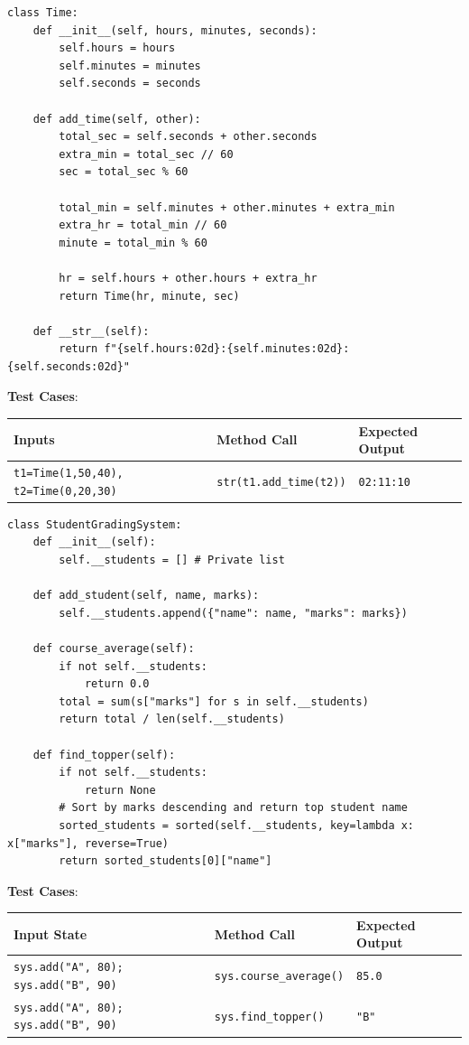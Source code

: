 \begin{solutionbox}
\begin{lstlisting}[language=Python3]
class Time:
    def __init__(self, hours, minutes, seconds):
        self.hours = hours
        self.minutes = minutes
        self.seconds = seconds
        
    def add_time(self, other):
        total_sec = self.seconds + other.seconds
        extra_min = total_sec // 60
        sec = total_sec % 60
        
        total_min = self.minutes + other.minutes + extra_min
        extra_hr = total_min // 60
        minute = total_min % 60
        
        hr = self.hours + other.hours + extra_hr
        return Time(hr, minute, sec)
        
    def __str__(self):
        return f"{self.hours:02d}:{self.minutes:02d}:{self.seconds:02d}"
\end{lstlisting}
\textbf{Test Cases}:
\begin{tabular}{|l|l|l|}
\hline
\textbf{Inputs} & \textbf{Method Call} & \textbf{Expected Output} \\ \hline
\texttt{t1=Time(1,50,40), t2=Time(0,20,30)} & \texttt{str(t1.add\_time(t2))} & \texttt{02:11:10} \\ \hline
\end{tabular}
\end{solutionbox}

\begin{solutionbox}
\begin{lstlisting}[language=Python3]
class StudentGradingSystem:
    def __init__(self):
        self.__students = [] # Private list
        
    def add_student(self, name, marks):
        self.__students.append({"name": name, "marks": marks})
        
    def course_average(self):
        if not self.__students:
            return 0.0
        total = sum(s["marks"] for s in self.__students)
        return total / len(self.__students)
        
    def find_topper(self):
        if not self.__students:
            return None
        # Sort by marks descending and return top student name
        sorted_students = sorted(self.__students, key=lambda x: x["marks"], reverse=True)
        return sorted_students[0]["name"]
\end{lstlisting}
\textbf{Test Cases}:
\begin{tabular}{|l|l|l|}
\hline
\textbf{Input State} & \textbf{Method Call} & \textbf{Expected Output} \\ \hline
\texttt{sys.add("A", 80); sys.add("B", 90)} & \texttt{sys.course\_average()} & \texttt{85.0} \\ \hline
\texttt{sys.add("A", 80); sys.add("B", 90)} & \texttt{sys.find\_topper()} & \texttt{"B"} \\ \hline
\end{tabular}
\end{solutionbox}


